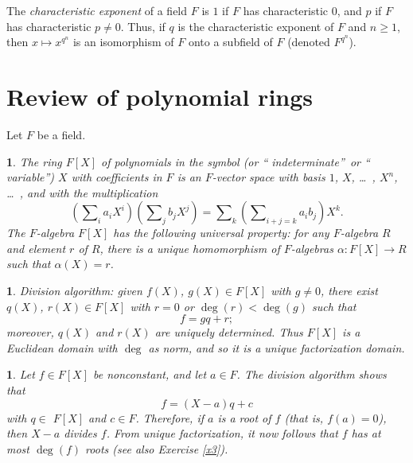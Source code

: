\documentclass[a4paper,11pt,final,openany]{memoir}
\newtheorem{plain}[X]{}
\theoremstyle{nonumberplain}
\begin{document}
The
%
\emph{characteristic exponent} of a field $F$ is $1$ if $F$ has characteristic
$0$, and $p$ if $F$ has characteristic $p\neq0$. Thus, if $q$ is the
characteristic exponent of $F$ and $n\geq1$, then $x\mapsto x^{q^{n}}$ is an
isomorphism of $F$ onto a subfield of $F$ (denoted
%
$F^{q^{n}}$).

\section{Review of polynomial rings}

Let $F$ be a field.

\begin{plain}
\label{ef3a}The ring $F[X]$ of polynomials in the symbol (or \textquotedblleft
indeterminate\textquotedblright\ or \textquotedblleft
variable\textquotedblright) $X$ with coefficients in $F$ is an $F$-vector
space with basis $1$, $X$, \ldots\ , $X^{n}$, \ldots\ , and with the
multiplication
\[
\left(  \sum\nolimits_{i}a_{i}X^{i}\right)  \left(  \sum\nolimits_{j}%
b_{j}X^{j}\right)  =\sum\nolimits_{k}\left(  \sum\nolimits_{i+j=k}a_{i}%
b_{j}\right)  X^{k}.
\]
The $F$-algebra $F[X]$ has the following universal property: for any
$F$-algebra $R$ and element $r$ of $R$, there is a unique homomorphism of
$F$-algebras $\alpha\colon F[X]\rightarrow R$ such that $\alpha(X)=r$.
\end{plain}

\begin{plain}
\label{ef3b}\emph{Division algorithm\/}:%
given $f(X)$, $g(X)\in F[X]$ with $g\neq0$, there exist $q(X)$, $r(X)\in F[X]$
with $r=0$ or $\deg(r)<\deg(g)$ such that
\[
f=gq+r;
\]
moreover, $q(X)$ and $r(X)$ are uniquely determined. Thus $F[X]$ is a
Euclidean domain with $\deg$ as norm, and so it is a unique factorization domain.
\end{plain}

\begin{plain}
\label{ef3c}Let $f\in F[X]$ be nonconstant, and let $a\in F$. The division
algorithm shows that%
\[
f=(X-a)q+c
\]
with $q\in$ $F[X]$ and $c\in F$. Therefore, if $a$ is a
%
root of $f$ (that is, $f(a)=0$), then $X-a$ divides $f$. From unique
factorization, it now follows that $f$ has at most $\deg(f)$ roots (see also
Exercise \ref{x3}).
\end{plain}
\end{document}
